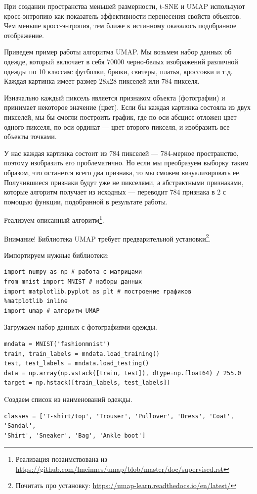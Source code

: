 	При создании пространства меньшей размерности, t-SNE и UMAP используют кросс-энтропию как показатель эффективности перенесения свойств объектов. Чем меньше кросс-энтропия, тем ближе к истинному оказалось подобранное отображение.
	
	Приведем пример работы алгоритма UMAP. Мы возьмем набор данных об одежде, который включает в себя 70000 черно-белых изображений различной одежды по 10 классам: футболки, брюки, свитеры, платья, кроссовки и т.д. Каждая картинка имеет размер 28x28 пикселей или 784 пикселя.
	
	Изначально каждый пиксель является признаком объекта (фотографии) и принимает некоторое значение (цвет). Если бы каждая картинка состояла из двух пикселей, мы бы смогли построить график, где по оси абсцисс отложен цвет одного пикселя, по оси ординат --- цвет второго пикселя, и изобразить все объекты точками.
	
	У нас каждая картинка состоит из 784 пикселей --- 784-мерное пространство, поэтому изобразить его проблематично. Но если мы преобразуем выборку таким образом, что останется всего два признака, то мы сможем визуализировать ее. Получившиеся признаки будут уже не пикселями, а абстрактными признаками, которые алгоритм получает из исходных --- переводит 784 признака в 2 с помощью функции, подобранной в результате работы.
	
	Реализуем описанный алгоритм\footnote{Реализация позаимствована из \url{https://github.com/lmcinnes/umap/blob/master/doc/supervised.rst}}.
	
	Внимание! Библиотека UMAP требует предварительной установки\footnote{Почитать про установку: \url{https://umap-learn.readthedocs.io/en/latest/}}.
	
	Импортируем нужные библиотеки:
	\begin{verbatim}
import numpy as np # работа с матрицами
from mnist import MNIST # наборы данных
import matplotlib.pyplot as plt # построение графиков
%matplotlib inline
import umap # алгоритм UMAP
	\end{verbatim}
	
	Загружаем набор данных с фотографиями одежды.
	\begin{verbatim}
mndata = MNIST('fashionmnist')
train, train_labels = mndata.load_training() 
test, test_labels = mndata.load_testing()
data = np.array(np.vstack([train, test]), dtype=np.float64) / 255.0
target = np.hstack([train_labels, test_labels])
	\end{verbatim}

	Cоздаем список из наименований одежды.
\begin{verbatim}
classes = ['T-shirt/top', 'Trouser', 'Pullover', 'Dress', 'Coat', 'Sandal', 
'Shirt', 'Sneaker', 'Bag', 'Ankle boot']
\end{verbatim}

